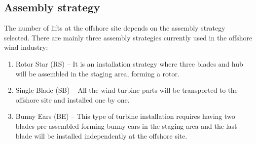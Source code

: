 \subsection{Assembly strategy}
The number of lifts at the offshore site depends on the assembly strategy selected. There are mainly three assembly strategies currently used in the offshore wind industry:

\begin{enumerate}
\item Rotor Star (RS) -- It is an installation strategy where three blades and hub will be assembled in the staging area, forming a rotor.
\item Single Blade (SB) -- All the wind turbine parts will be transported to the offshore site and installed one by one.
\item Bunny Ears (BE) -- This type of turbine installation requires having two blades pre-assembled forming bunny ears in the staging area and the last blade will be installed independently at the offshore site.
\end{enumerate}